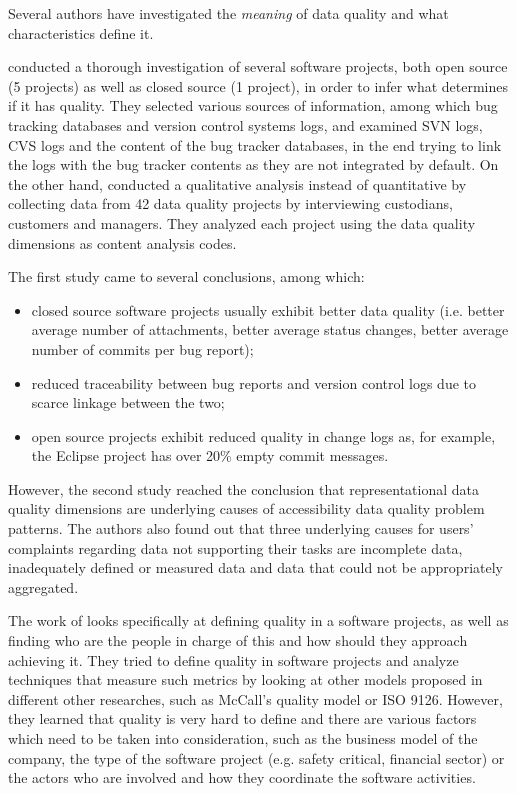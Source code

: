 \documentclass{mprop}
\begin{document}
Several authors have investigated the \emph{meaning} of data quality and
what characteristics define it.

\citet{bachmann2009software} conducted a thorough investigation of several
software projects, both open source (5 projects) as well as closed source (1 
project), in order to infer what determines if it has quality. They selected 
various sources of information, among which bug tracking 
databases and version control systems logs, and examined SVN logs, CVS logs
and the content of the bug tracker databases, in the end trying to link 
the logs with the bug tracker contents as they are not integrated by default. 
On the other hand, \citet{strong1997data} conducted a qualitative analysis
instead of quantitative by collecting data from 42 data quality projects by 
interviewing custodians, customers and managers. They analyzed each project
using the data quality dimensions as content analysis codes.

The first study came to several conclusions, among which:
  \begin{itemize}
    \item closed source software projects usually exhibit better data quality 
    (i.e. better average number of attachments, better average status changes, 
    better average number of commits per bug report);
    \item reduced traceability between bug reports and version control logs
    due to scarce linkage between the two;
    \item open source projects exhibit reduced quality in change logs as,
    for example, the Eclipse project has over 20\% empty commit messages.
  \end{itemize}

However, the second study reached the conclusion that representational data 
quality dimensions are underlying causes of accessibility data quality problem
patterns. The authors also found out that three underlying causes for users'
complaints regarding data not supporting their tasks are incomplete data, 
inadequately defined or measured data and data that could not be appropriately
aggregated.

The work of \citet{kitchenham1996software} looks specifically at defining
quality in a software projects, as well as finding who are the people in charge of 
this and how should they approach achieving it. They tried to define quality 
in software projects and analyze techniques that measure such metrics by looking
at other models proposed in different other researches, such as McCall's quality
model or ISO 9126. However, they learned that quality is very hard to define and
there are various factors which need to be taken into consideration, such as the
business model of the company, the type of the software project (e.g. safety 
critical, financial sector) or the actors who are involved and how they coordinate
the software activities.
\end{document}
